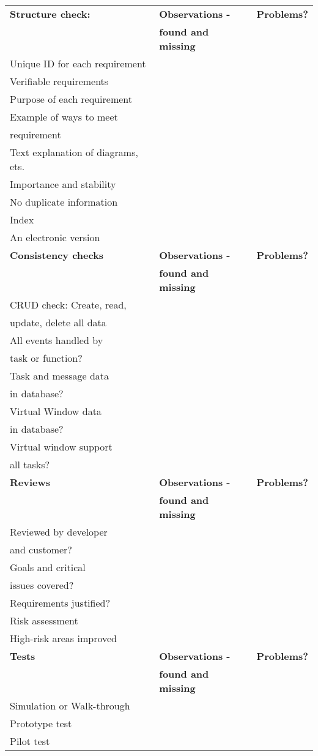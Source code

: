 \documentclass[a4paper]{article}
\begin{document}
	\begin{tabular}{|l|l|l|} \hline
		\textbf{Structure check:} & \textbf{Observations -} & \textbf{Problems?}	\\
			& \textbf{found and missing}	&	\\ \hline
		Unique ID for each requirement	&	&	\\ \hline
		Verifiable requirements	&	&	\\ \hline
		Purpose of each requirement	&	&	\\ \hline
		Example of ways to meet	&	&	\\
		requirement	&	&	\\ \hline
		Text explanation of diagrams, ets.	&	&	\\ \hline
		Importance and stability	&	&	\\ \hline
		No duplicate information	&	&	\\ \hline
		Index	&	&	\\ \hline
		An electronic version	&	&	\\ \hline
		\textbf{Consistency checks}	& \textbf{Observations -} & \textbf{Problems?} \\
			& \textbf{found and missing}	&	\\ \hline
		CRUD check: Create, read, &	&	\\
		update, delete all data	&	&	\\ \hline
		All events handled by	&	&	\\ 
		task or function?	&	&	\\ \hline
		Task and message data	&	&	\\
		in database?	&	&	\\ \hline
		Virtual Window data	&	&	\\
		in database?	&	&	\\ \hline
		Virtual window support	&	&	\\
		all tasks?	&	&	\\ \hline
		\textbf{Reviews}     & \textbf{Observations -} & \textbf{Problems?} \\
                        & \textbf{found and missing}    &       \\ \hline
		Reviewed by developer	&	&	\\
		and customer?	&	&	\\ \hline
		Goals and critical	&	&	\\
		issues covered?	&	&	\\ \hline
		Requirements justified?	&	&	\\ \hline
		Risk assessment	&	&	\\ \hline
		High-risk areas improved	&	&	\\ \hline
		\textbf{Tests}     & \textbf{Observations -} & \textbf{Problems?} \\
                        & \textbf{found and missing}    &       \\ \hline
		Simulation or Walk-through	&	&	\\ \hline
		Prototype test	&	&	\\ \hline
		Pilot test	&	&	\\ \hline
		\end{tabular}
\end{document}
